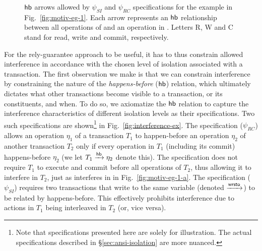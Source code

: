 \begin{figure}
\caption{\small $\textsf{hb}$ arrows allowed by $\psi_{SI}$
 and $\psi_{RC}$ specifications
for the example in Fig.~\ref{fig:motiv-eg-1}. Each
arrow represents an $\textsf{hb}$ relationship between all operations of
 and an operation in . Letters R, W and C stand for
read, write and commit, respectively.}
\label{fig:motiv-eg-1-hb}
\vspace*{-8pt}
\end{figure}

For the rely-guarantee approach to be useful, it has to thus constrain
allowed interference in accordance with the chosen level of isolation
associated with a transaction. The first observation we make is that
we can constrain interference by constraining the nature of the
\emph{happens-before} ($\textsf{hb}$) relation, which ultimately dictates
what other transactions become visible to a transaction, or its
constituents, and when. To do so, we axiomatize the $\textsf{hb}$ relation to
capture the interference characteristics of different isolation levels
as their specifications. Two such specifications are
shown\footnote{Note that specifications presented here are solely for
illustration. The actual specifications described in
\S\ref{sec:ansi-isolation} are more nuanced.} in
Fig.~\ref{fig:interference-ex}. The  specification
($\psi_{RC}$) allows an operation $\eta_1$ of a transaction $T_1$ to
happen-before an operation $\eta_2$ of another transaction $T_2$ only
if every operation in $T_1$ (including its commit) happens-before
$\eta_2$ (we let $T_1 \xrightarrow{\textsf{hb}} \eta_2$ denote this). The specification
does not require $T_1$ to execute and commit before all operations of
$T_2$, thus allowing it to interfere in $T_2$, just as 
interferes in  in Fig.~\ref{fig:motiv-eg-1-a}. The
 specification ($\psi_{SI}$) requires two
transactions that write to the same variable (denoted $\xrightarrow{\textsf{wrsto}}$) to be
related by happens-before.  This effectively prohibits interference
due to actions in $T_1$ being interleaved in $T_2$ (or, vice versa). 

